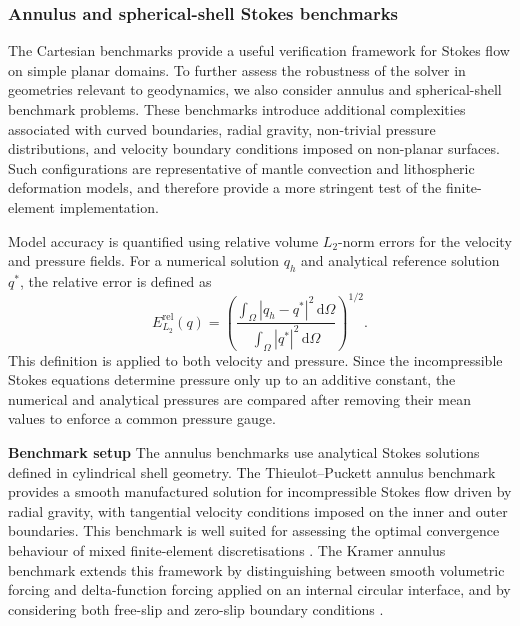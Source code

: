 
\subsubsection{Annulus and spherical-shell Stokes benchmarks}

The Cartesian benchmarks provide a useful verification framework for Stokes
flow on simple planar domains. To further assess the robustness of the solver
in geometries relevant to geodynamics, we also consider annulus and
spherical-shell benchmark problems. These benchmarks introduce additional
complexities associated with curved boundaries, radial gravity, non-trivial
pressure distributions, and velocity boundary conditions imposed on
non-planar surfaces. Such configurations are representative of mantle
convection and lithospheric deformation models, and therefore provide a more
stringent test of the finite-element implementation.

Model accuracy is quantified using relative volume \(L_2\)-norm errors for the
velocity and pressure fields. For a numerical solution \(q_h\) and analytical
reference solution \(q^{*}\), the relative error is defined as
\begin{equation}
E_{L_2}^{\mathrm{rel}}(q)
=
\left(
\frac{\int_{\Omega} |q_h-q^{*}|^2 \,\mathrm{d}\Omega}
     {\int_{\Omega} |q^{*}|^2 \,\mathrm{d}\Omega}
\right)^{1/2}.
\end{equation}
This definition is applied to both velocity and pressure. Since the
incompressible Stokes equations determine pressure only up to an additive
constant, the numerical and analytical pressures are compared after removing
their mean values to enforce a common pressure gauge.

\textbf{Benchmark setup}
The annulus benchmarks use analytical Stokes solutions defined in cylindrical
shell geometry. The Thieulot--Puckett annulus benchmark provides a smooth
manufactured solution for incompressible Stokes flow driven by radial gravity,
with tangential velocity conditions imposed on the inner and outer boundaries.
This benchmark is well suited for assessing the optimal convergence behaviour
of mixed finite-element discretisations
\citep{thieulot2018,girault1986femns,boffi2013}. The Kramer annulus benchmark
extends this framework by distinguishing between smooth volumetric forcing and
delta-function forcing applied on an internal circular interface, and by
considering both free-slip and zero-slip boundary conditions
\citep{kramer2021}.

